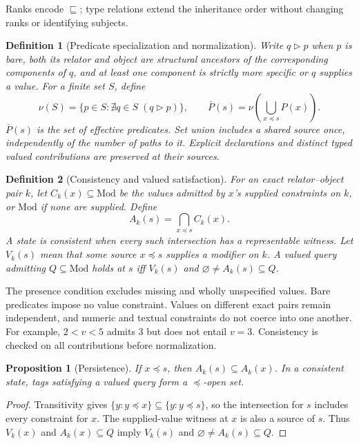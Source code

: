 \documentclass{article}
\newtheorem{definition}{Definition}[section]
\newtheorem{proposition}{Proposition}[section]
\begin{document}
Ranks encode $\sqsubseteq$; type relations extend the inheritance order
without changing ranks or identifying subjects.

\begin{definition}[Predicate specialization and normalization]
Write $q\mathrel{\triangleright}p$ when $p$ is bare, both its relator and
object are structural ancestors of the corresponding components of $q$,
and at least one component is strictly more specific or $q$ supplies a value.
For a finite set $S$, define
\[
 \nu(S)=\{p\in S:\nexists q\in S\;(q\mathrel{\triangleright}p)\},\qquad
 \bar P(s)=\nu\!\left(\bigcup_{x\preceq s}P(x)\right).
\]
$\bar P(s)$ is the set of effective predicates. Set union includes a shared
source once, independently of the number of paths to it. Explicit declarations
and distinct typed valued contributions are preserved at their sources.
\end{definition}

\begin{definition}[Consistency and valued satisfaction]
For an exact relator--object pair $k$, let $C_k(x)\subseteq\mathrm{Mod}$
be the values admitted by $x$'s supplied constraints on $k$, or
$\mathrm{Mod}$ if none are supplied. Define
\[
 A_k(s)=\bigcap_{x\preceq s}C_k(x).
\]
A state is consistent when every such intersection has a representable witness.
Let $V_k(s)$ mean that some source $x\preceq s$ supplies a modifier on $k$.
A valued query admitting $Q\subseteq\mathrm{Mod}$ holds at $s$ iff
$V_k(s)$ and $\varnothing\ne A_k(s)\subseteq Q$.
\end{definition}

The presence condition excludes missing and wholly unspecified values.
Bare predicates impose no value constraint. Values on different exact pairs
remain independent, and numeric and textual constraints do not coerce into
one another. For example, $2<v<5$ admits $3$ but does not entail $v=3$.
Consistency is checked on all contributions before normalization.

\begin{proposition}[Persistence]
If $x\preceq s$, then $A_k(s)\subseteq A_k(x)$. In a consistent state,
tags satisfying a valued query form a $\preceq$-open set.
\end{proposition}
\begin{proof}
Transitivity gives $\{y:y\preceq x\}\subseteq\{y:y\preceq s\}$, so the
intersection for $s$ includes every constraint for $x$. The supplied-value
witness at $x$ is also a source of $s$. Thus $V_k(x)$ and $A_k(x)\subseteq Q$
imply $V_k(s)$ and $\varnothing\ne A_k(s)\subseteq Q$.
\end{proof}
\end{document}
